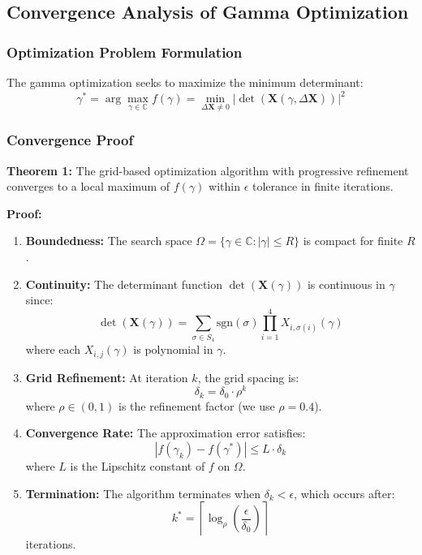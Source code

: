 \subsection{Convergence Analysis of Gamma Optimization}

\subsubsection{Optimization Problem Formulation}
The gamma optimization seeks to maximize the minimum determinant:
\begin{equation}
\gamma^* = \arg \max_{\gamma \in \mathbb{C}} f(\gamma) = \min_{\Delta\mathbf{X} \neq 0} |\det(\mathbf{X}(\gamma, \Delta\mathbf{X}))|^2
\end{equation}

\subsubsection{Convergence Proof}
\textbf{Theorem 1:} The grid-based optimization algorithm with progressive refinement converges to a local maximum of $f(\gamma)$ within $\epsilon$ tolerance in finite iterations.

\textbf{Proof:} 
\begin{enumerate}
    \item \textbf{Boundedness:} The search space $\Omega = \{\gamma \in \mathbb{C} : |\gamma| \leq R\}$ is compact for finite $R$.
    
    \item \textbf{Continuity:} The determinant function $\det(\mathbf{X}(\gamma))$ is continuous in $\gamma$ since:
    \begin{equation}
    \det(\mathbf{X}(\gamma)) = \sum_{\sigma \in S_4} \text{sgn}(\sigma) \prod_{i=1}^{4} X_{i,\sigma(i)}(\gamma)
    \end{equation}
    where each $X_{i,j}(\gamma)$ is polynomial in $\gamma$.
    
    \item \textbf{Grid Refinement:} At iteration $k$, the grid spacing is:
    \begin{equation}
    \delta_k = \delta_0 \cdot \rho^k
    \end{equation}
    where $\rho \in (0,1)$ is the refinement factor (we use $\rho = 0.4$).
    
    \item \textbf{Convergence Rate:} The approximation error satisfies:
    \begin{equation}
    |f(\gamma_k) - f(\gamma^*)| \leq L \cdot \delta_k
    \end{equation}
    where $L$ is the Lipschitz constant of $f$ on $\Omega$.
    
    \item \textbf{Termination:} The algorithm terminates when $\delta_k < \epsilon$, which occurs after:
    \begin{equation}
    k^* = \left\lceil \log_{\rho}\left(\frac{\epsilon}{\delta_0}\right) \right\rceil
    \end{equation}
    iterations.
\end{enumerate}


